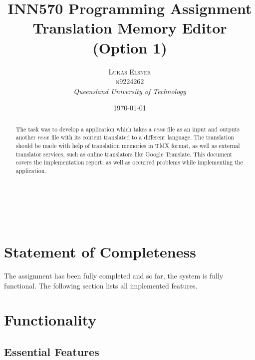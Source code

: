 \documentclass[a4paper, 12pt]{scrartcl} %
\title{\textbf{INN570 Programming Assignment}\\ %
Translation Memory Editor (Option 1)} %
\author{\textsc{Lukas Elsner \\ n9224262} %
\\{\textit{Queensland University of Technology}}} %
\date{\today} %
\makeatletter
\renewcommand{\maketitle}{ %
  \begin{flushright} %
    {\LARGE\@title}\\ %
    \vspace{50pt} %
    {\large\@author} %
    \\\@date %
    \vspace{40pt} %
  \end{flushright}
}
\makeatother
\begin{document}
\maketitle %
\thispagestyle{empty}
\vspace{10em}
\begin{abstract}
  The task was to develop a application which takes a $resx$ file as an input and
  outputs another $resx$ file with its content translated to a different
  language. The translation should be made with help of translation memories in
  TMX format, as well as external translator services, such as online translators
  like Google Translate. This document covers the implementation report, as well
  as occurred problems while implementing the application.
\end{abstract}
\newpage
\tableofcontents
\newpage

\section{Statement of Completeness}

The assignment has been fully completed and so far, the system is fully functional. The following section lists all implemented features.

\section{Functionality}

\subsection{Essential Features}
\end{document}
